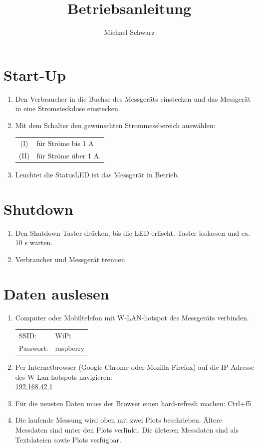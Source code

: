 \documentclass[a4paper]{article}
\title{Betriebsanleitung}
\author{Michael Schwarz}
\begin{document}
\maketitle

\section{Start-Up}
\begin{enumerate}
\item Den Verbraucher in die Buchse des Messgeräts einstecken und das Messgerät in eine Stromsteckdose einstecken.
\item Mit dem Schalter den gewünschten Strommessbereich auswählen: \\
	\begin{tabular}{c l}
		(I)  & für Ströme bis 1 A   \\
		(II) & für Ströme über 1 A. \\
	\end{tabular}
\item Leuchtet die StatusLED ist das Messgerät in Betrieb.
\end{enumerate}

\section{Shutdown}
\begin{enumerate}
	\item Den Shutdown-Taster drücken, bis die LED erlischt. Taster loslassen und ca. 10 s warten.
	\item Verbraucher und Messgerät trennen.
\end{enumerate}

\section{Daten auslesen}
\begin{enumerate}
	\item Computer oder Mobiltelefon mit W-LAN-hotspot des Messgeräts verbinden. \\
		\begin{tabular}{l l}
			SSID:     & WiPi      \\
			Passwort: & raspberry \\
		\end{tabular}
	\item Per Internetbrowser (Google Chrome oder Mozilla Firefox) auf die IP-Adresse des W-Lan-hotspots navigieren: \\
		\url{192.168.42.1}
	\item Für die neusten Daten muss der Browser einen hard-refresh machen: Ctrl+f5
	\item Die laufende Messung wird oben mit zwei Plots beschrieben. 
		Ältere Messdaten sind unter den Plots verlinkt.
		Die äleteren Messdaten sind als Textdateien sowie Plots verfügbar.
\end{enumerate}
\end{document}
